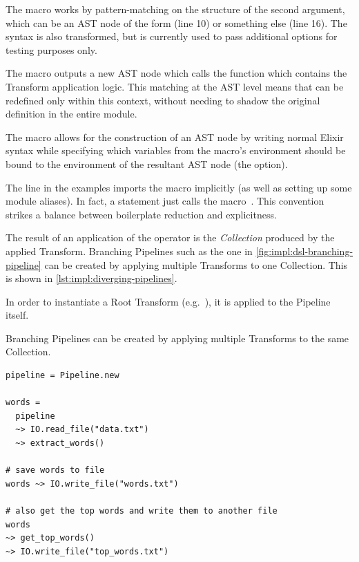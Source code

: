 The \exs{~>} macro works by pattern-matching on the structure of the second argument, which can be an AST node of the form  (line 10) or something else (line 16).
The  syntax is also transformed, but is currently used to pass additional options for testing purposes only.

The macro outputs a new AST node which calls the  function which contains the Transform application logic.
This matching at the AST level means that \exs{--} can be redefined only within this context, without needing to shadow the original definition in the entire module.

The  macro allows for the construction of an AST node by writing normal Elixir syntax while specifying which variables from the macro's environment should be bound to the environment of the resultant AST node (the  option).

The  line in the examples imports the \exs{~>} macro implicitly (as well as setting up some module aliases).
In fact, a  statement just calls the  macro~\cite[p.~35]{Elixir-Metaprogramming}.
This convention strikes a balance between boilerplate reduction and explicitness.

The result of an application of the \exs{~>} operator is the \emph{Collection} produced by the applied Transform.
Branching Pipelines such as the one in \cref{fig:impl:dsl-branching-pipeline} can be created by applying multiple Transforms to one Collection.
This is shown in \cref{lst:impl:diverging-pipelines}.

In order to instantiate a Root Transform (e.g.\ ), it is applied to the Pipeline itself.

\begin{listing}[h]
	\caption[An example of creating branching Pipelines through application of multiple Transforms to one Collection.]{Branching Pipelines can be created by applying multiple Transforms to the same Collection.}
	\label{lst:impl:diverging-pipelines}
	\begin{verbatim}
pipeline = Pipeline.new

words =
  pipeline
  ~> IO.read_file("data.txt")
  ~> extract_words()
  
# save words to file
words ~> IO.write_file("words.txt")

# also get the top words and write them to another file
words
~> get_top_words()
~> IO.write_file("top_words.txt")
	\end{verbatim}
\end{listing}


